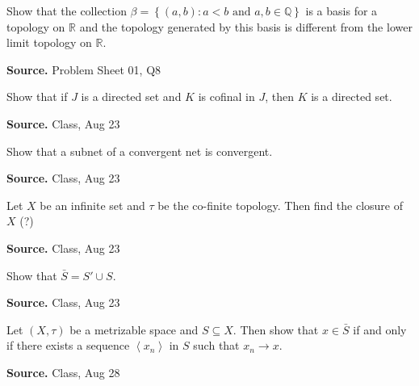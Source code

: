 \documentclass[12pt,twoside]{report}
\newenvironment*{source}{\hfill\scriptsize\textbf{Source.}\space}{\par}
\begin{document}
\begin{samepage}
\begin{ex}
Show that the collection $\beta = \left\{ \left (a,b\right )  :  a < b \text{ and } a, b \in \mathbb{Q} \right\}$ is a basis for a topology on $\mathbb{R}$ and the topology generated by this basis is different from the lower limit topology on $\mathbb{R}$.
\end{ex}
\begin{source}
Problem Sheet 01, Q8
\end{source}
\end{samepage}

\begin{samepage}
\begin{ex}
Show that if $J$ is a directed set and $K$ is cofinal in $J$, then $K$ is a directed set.
\end{ex}
\begin{source}
Class, Aug 23
\end{source}
\end{samepage}

\begin{samepage}
\begin{ex}
Show that a subnet of a convergent net is convergent.
\end{ex}
\begin{source}
Class, Aug 23
\end{source}
\end{samepage}

\begin{samepage}
\begin{ex}
Let $X$ be an infinite set and $\tau$ be the co-finite topology. Then find the closure of $X$ (?)
\end{ex}
\begin{source}
Class, Aug 23
\end{source}
\end{samepage}

\begin{samepage}
\begin{ex}
Show that $\bar{S} = S' \cup S$.
\end{ex}
\begin{source}
Class, Aug 23
\end{source}
\end{samepage}

\begin{samepage}
\begin{ex}
Let $\left (X, \tau\right )$ be a metrizable space and $S \subseteq X$. Then show that $x \in \bar{S}$ if and only if there exists a sequence $\left\langle x_n\right\rangle $ in $S$ such that $x_n \to x$.
\end{ex}
\begin{source}
Class, Aug 28
\end{source}
\end{samepage}
\end{document}
